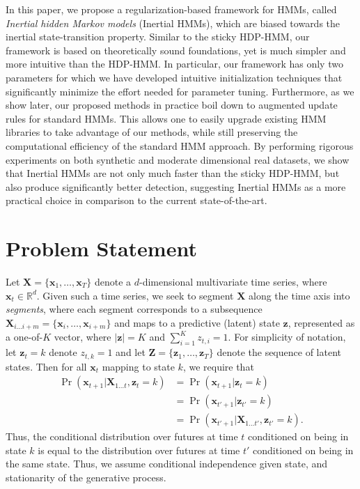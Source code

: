 \documentclass[letterpaper]{article}
\begin{document}
In this paper, we propose a regularization-based framework for HMMs, called
\emph{Inertial hidden Markov models} (Inertial HMMs), which are biased towards the inertial 
state-transition property. Similar to the sticky HDP-HMM, our framework is based on 
theoretically sound foundations, yet is much simpler and more intuitive than the HDP-HMM. 
In particular, our framework has only two parameters for which we have 
developed intuitive initialization techniques that significantly minimize the effort 
needed for parameter tuning. Furthermore, as we show later, our proposed
methods in practice boil down to augmented update rules for standard HMMs. This allows one to easily 
upgrade existing HMM libraries to take advantage of our methods, while still preserving the
computational efficiency of the standard HMM approach. By performing rigorous
experiments on both synthetic and moderate dimensional real datasets, we show
that Inertial HMMs are not only much faster than the sticky HDP-HMM, but also produce 
significantly better detection, suggesting Inertial HMMs as a more practical 
choice in comparison to the current state-of-the-art.

\section{Problem Statement}

Let $\mathbf{X} = \{\mathbf{x}_1, \ldots, \mathbf{x}_T\}$ denote a
$d$-dimensional multivariate time series, where $\mathbf{x}_t \in \mathbb{R}^d$.
Given such a time series, we seek to segment $\mathbf{X}$ along the time axis
into \emph{segments}, where each segment corresponds to a subsequence
$\mathbf{X}_{i\ldots i+m} = \{\mathbf{x}_i, \ldots, \mathbf{x}_{i+m}\}$ and maps
to a predictive (latent) state $\mathbf{z}$, represented as a one-of-$K$ vector,
where $|\mathbf{z}| = K$ and $\sum_{i=1}^{K}z_{t,i} = 1$. For simplicity of
notation, let $\mathbf{z}_{t} = k$ denote $z_{t,k} = 1$ and let $\mathbf{Z} =
\{\mathbf{z}_1, \ldots, \mathbf{z}_T\}$ denote the sequence of latent states.
Then for all $\mathbf{x}_{t}$ mapping to state $k$, we require that
\begin{align*}
    \Pr(\mathbf{x}_{t+1}|\mathbf{X}_{1\ldots t}, \mathbf{z}_t = k) 
    &= \Pr(\mathbf{x}_{t+1}| \mathbf{z}_t = k) \\
    &= \Pr(\mathbf{x}_{t'+1}| \mathbf{z}_{t'} = k) \\
    &= \Pr(\mathbf{x}_{t'+1}| \mathbf{X}_{1\ldots t'}, \mathbf{z}_{t'} = k).
\end{align*}
Thus, the conditional distribution over futures at time $t$ conditioned on being
in state $k$ is equal to the distribution over futures at time $t'$ conditioned
on being in the same state. Thus, we assume conditional independence given
state, and stationarity of the generative process.
\end{document}
